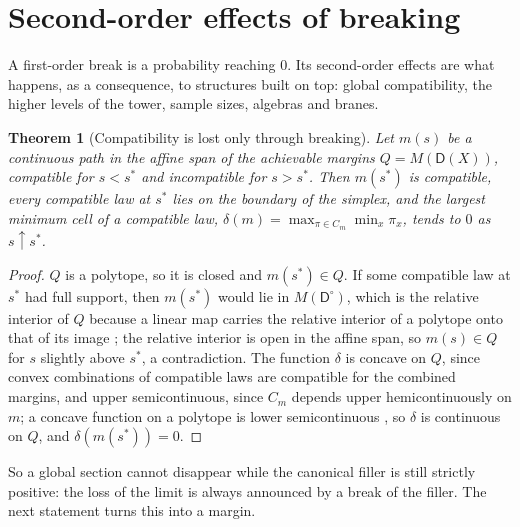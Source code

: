 \documentclass[11pt]{article}
\newtheorem{theorem}{Theorem}[section]
\theoremstyle{definition}
\theoremstyle{remark}
\newcommand{\D}{\mathsf{D}}
\begin{document}
\section{Second-order effects of breaking}\label{sec:secondorder}

A first-order break is a probability reaching $0$. Its second-order effects are what happens, as a consequence, to structures built
on top: global compatibility, the higher levels of the tower, sample sizes, algebras and branes.

\begin{theorem}[Compatibility is lost only through breaking]\label{thm:lossbybreak}
Let $m(s)$ be a continuous path in the affine span of the achievable margins $Q=M(\D(X))$, compatible for $s<s^*$ and incompatible for
$s>s^*$. Then $m(s^*)$ is compatible, every compatible law at $s^*$ lies on the boundary of the simplex, and the largest minimum cell
of a compatible law, $\delta(m)=\max_{\pi\in C_m}\min_x\pi_x$, tends to $0$ as $s\uparrow s^*$.
\end{theorem}
\begin{proof}
$Q$ is a polytope, so it is closed and $m(s^*)\in Q$. If some compatible law at $s^*$ had full support, then $m(s^*)$ would lie in
$M(\D^\circ)$, which is the relative interior of $Q$ because a linear map carries the relative interior of a polytope onto that of its
image \cite[Thm.~6.6]{Rockafellar1970}; the relative interior is open in the affine span, so $m(s)\in Q$ for $s$ slightly above $s^*$, a contradiction. The function
$\delta$ is concave on $Q$, since convex combinations of compatible laws are compatible for the combined margins, and upper
semicontinuous, since $C_m$ depends upper hemicontinuously on $m$; a concave function on a polytope is lower semicontinuous
\cite{GaleKleeRockafellar1968}, so $\delta$ is continuous on $Q$, and $\delta(m(s^*))=0$.
\end{proof}

So a global section cannot disappear while the canonical filler is still strictly positive: the loss of the limit is always announced
by a break of the filler. The next statement turns this into a margin.
\end{document}

